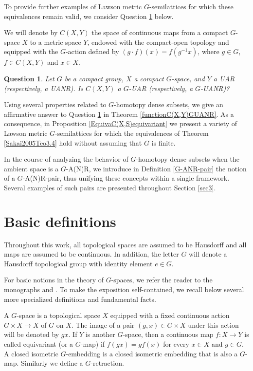 \documentclass[12pt]{amsart}
\newtheorem{question}[theorem]{Question}
\theoremstyle{definition}
\begin{document}
	To provide further examples of Lawson metric $G$-semilattices for which these equivalences remain valid, we consider Question \ref{preguntaC(X,Y)GUANR} below. 
	
	We will denote by $C(X,Y)$ the space of continuous maps from a compact $G$-space $X$ to a metric space $Y$, endowed with the compact-open topology and equipped with the $G$-action defined by $(g\cdot f)(x)=f(g^{-1}x)$, where $g\in G$, $f\in C(X, Y)$ and $x\in X$.
	
	\begin{question}\label{preguntaC(X,Y)GUANR}
		\rm{Let $G$ be a compact group, $X$ a compact $G$-space, and $Y$ a UAR (respectively, a UANR). Is $C(X,Y)$ a $G$-UAR (respectively, a $G$-UANR)?}
	\end{question}
	
	Using several properties related to $G$-homotopy dense subsets, we give an affirmative answer to Question \ref{preguntaC(X,Y)GUANR} in Theorem \ref{functionC(X,Y)GUANR}. As a consequence, in Proposition \ref{EquivaC(X,S)equivariant} we present a variety of Lawson metric $G$-semilattices for which the equivalences of Theorem \ref{Sakai2005Teo3.4} hold without assuming that $G$ is finite.
	
	In the course of analyzing the behavior of $G$-homotopy dense subsets when the ambient space is a $G$-A(N)R, we introduce in Definition \ref{G-ANR-pair} the notion of a $G$-A(N)R-pair, thus unifying these concepts within a single framework. Several examples of such pairs are presented throughout Section \ref{sec3}.
		
	\section{Basic definitions}\label{sec2}
	
	Throughout this work, all topological spaces are assumed to be Hausdorff and all maps are assumed to be continuous. In addition, the letter $G$ will denote a Hausdorff topological group with identity element $e\in G$.
	
	For basic notions in the theory of $G$-spaces, we refer the reader to the monographs \cite{GB} and \cite{RP}. To make the exposition self-contained, we recall below several more specialized definitions and fundamental facts.
	
	A $G$-space is a topological space $X$ equipped with a fixed continuous action $G \times X\rightarrow X$ of $G$ on $X$. The image of a pair $(g, x) \in G\times X$ under this action will be denoted by $gx$. If $Y$ is another $G$-space, then a continuous map $f:X\rightarrow Y$ is called equivariant (or a $G$-map) if $f(gx) =gf(x)$ for every $x\in X$ and $g\in G$. A closed isometric $G$-embedding is a closed isometric embedding that is also a $G$-map. Similarly we define a $G$-retraction.
	
\end{document}
